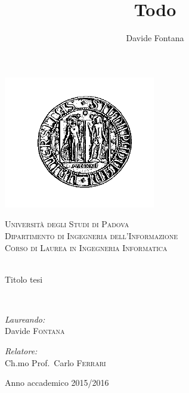 \documentclass[12pt,a4paper,twoside,openright]{book}
\title{Todo}
\author{Davide Fontana}
\date{}
\begin{document}
\begin{titlepage}
 
\begin{center}
 
\includegraphics[scale=.5]{img/logoBlack}
 
\textsc{\LARGE Università degli Studi di Padova}\\[1.5cm]
 
\textsc{\Large Dipartimento di Ingegneria dell'Informazione\\[0.2cm] Corso di Laurea in Ingegneria Informatica}\\[0.8cm]
  
\\[0.8cm]{\Huge \doublespacing\bfseries \begin{spacing}{1}{Titolo tesi}\end{spacing}}
\\[2cm]
 
\begin{minipage}{0.4\textwidth}
\begin{flushleft} \large
\emph{Laureando:}\\
Davide \textsc{Fontana}
\end{flushleft}
\end{minipage}
\begin{minipage}{0.4\textwidth}
\begin{flushright} \large
\emph{Relatore:} \\
Ch.mo Prof.\ Carlo \textsc{Ferrari}
\end{flushright}
\end{minipage}
 
\vfill
 
{\large Anno accademico 2015/2016}
 
\end{center}
 
\end{titlepage}

\end{document}

